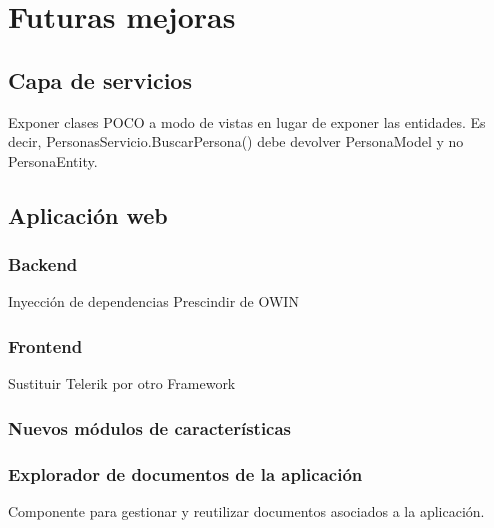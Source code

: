 \chapter{Futuras mejoras}

\section{Capa de servicios}
Exponer clases POCO a modo de vistas en lugar de exponer las entidades. Es decir, PersonasServicio.BuscarPersona() debe devolver PersonaModel y no PersonaEntity.

\section{Aplicación web}

\subsection{Backend}
Inyección de dependencias
Prescindir de OWIN

\subsection{Frontend}
Sustituir Telerik por otro Framework

\subsection{Nuevos módulos de características}

\subsection{Explorador de documentos de la aplicación}
Componente para gestionar y reutilizar documentos asociados a la aplicación.
